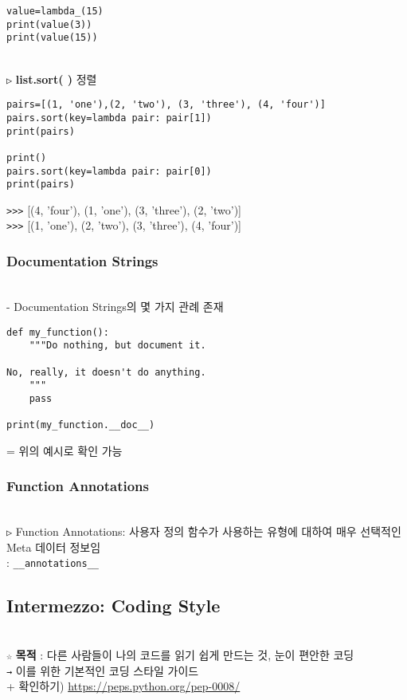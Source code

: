 \documentclass[11pt,a4paper]{article}
\begin{document}
\begin{spacing}{1.5}
\begin{lstlisting}[label={list:first}]
value=lambda_(15)
print(value(3))
print(value(15))
\end{lstlisting}\\

\texttt{▷} \textbf{list.sort( )} 정렬\\
\begin{lstlisting}[label={list:first}]
pairs=[(1, 'one'),(2, 'two'), (3, 'three'), (4, 'four')]
pairs.sort(key=lambda pair: pair[1])
print(pairs)

print()
pairs.sort(key=lambda pair: pair[0])
print(pairs)
\end{lstlisting}
\verb|>>>| [(4, 'four'), (1, 'one'), (3, 'three'), (2, 'two')]\\

\verb|>>>| [(1, 'one'), (2, 'two'), (3, 'three'), (4, 'four')]\\

\subsubsection{\Large\textbf{Documentation Strings}}\\
- Documentation Strings의 몇 가지 관례 존재
\begin{lstlisting}[label={list:first}]
def my_function():
    """Do nothing, but document it.

No, really, it doesn't do anything.
    """
    pass

print(my_function.__doc__)
\end{lstlisting}
= 위의 예시로 확인 가능\\

\subsubsection{\Large\textbf{Function Annotations}}\\
\texttt{▷} Function Annotations: 사용자 정의 함수가 사용하는 유형에 대하여 매우 선택적인 Meta 데이터 정보임\\
: \verb|__annotations__|

\subsection{\Large\textbf{Intermezzo: Coding Style}}\\
\verb|☆| \textbf{목적} :  다른 사람들이 나의 코드를 읽기 쉽게 만드는 것, 눈이 편안한 코딩\\
\texttt{→} 이를 위한 기본적인 코딩 스타일 가이드\\

+ 확인하기) \url{https://peps.python.org/pep-0008/}
\end{spacing}\\
\end{document}
